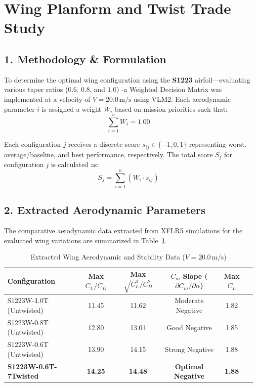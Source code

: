 \documentclass{article}
\begin{document}
\section*{Wing Planform and Twist Trade Study}

\subsection*{1. Methodology \& Formulation}
To determine the optimal wing configuration using the \textbf{S1223} airfoil—evaluating various taper ratios ($0.6$, $0.8$, and $1.0$) -a Weighted Decision Matrix was implemented at a velocity of $V = 20.0\,\text{m/s}$ using VLM2. Each aerodynamic parameter $i$ is assigned a weight $W_i$ based on mission priorities such that:
\begin{equation}
    \sum_{i=1}^{n} W_i = 1.00
\end{equation}

Each configuration $j$ receives a discrete score $s_{ij} \in \{-1, 0, 1\}$ representing worst, average/baseline, and best performance, respectively. The total score $S_j$ for configuration $j$ is calculated as:
\begin{equation}
    S_j = \sum_{i=1}^{n} \left( W_i \cdot s_{ij} \right)
\end{equation}

\subsection*{2. Extracted Aerodynamic Parameters}
The comparative aerodynamic data extracted from XFLR5 simulations for the evaluated wing variations are summarized in Table~\ref{tab:extracted_data}.

\begin{table}[h!]
\centering
\caption{Extracted Wing Aerodynamic and Stability Data ($V = 20.0\,\text{m/s}$)}
\label{tab:extracted_data}
\begin{tabular}{lccccc}
\toprule
\textbf{Configuration} & \textbf{Max $C_L/C_D$} & \textbf{Max $\sqrt{C_L^3}/C_D^2$} & \textbf{$C_{m}$ Slope ($\partial C_m / \partial \alpha$)} & \textbf{Max $C_L$} \\
\midrule
S1223W-1.0T (Untwisted)   & 11.45 & 11.62 & Moderate Negative & 1.82 \\
S1223W-0.8T (Untwisted)   & 12.80 & 13.01 & Good Negative     & 1.85 \\
S1223W-0.6T (Untwisted)   & 13.90 & 14.15 & Strong Negative   & 1.88 \\
\textbf{S1223W-0.6T-7Twisted} & \textbf{14.25} & \textbf{14.48} & \textbf{Optimal Negative} & \textbf{1.88} \\
\bottomrule
\end{tabular}
\end{table}
\end{document}
